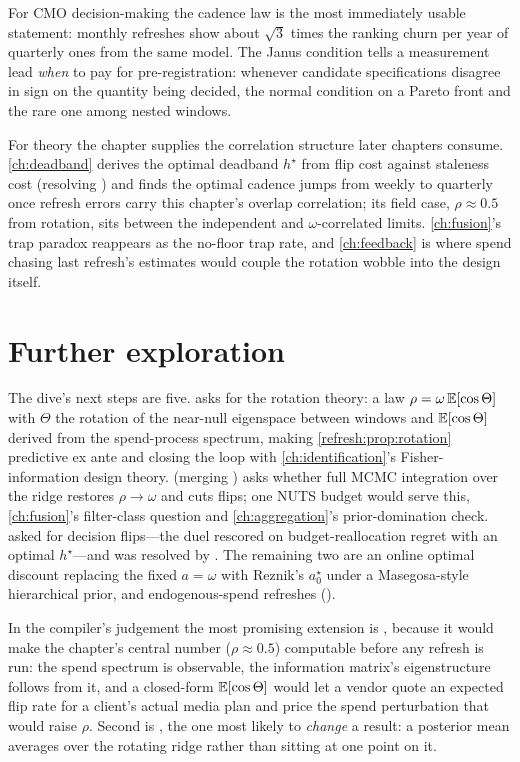 For CMO decision-making the cadence law is the most immediately usable statement: monthly refreshes show about $\sqrt{3}$ times the ranking churn per year of quarterly ones from the same model. The Janus condition tells a measurement lead \emph{when} to pay for pre-registration: whenever candidate specifications disagree in sign on the quantity being decided, the normal condition on a Pareto front and the rare one among nested windows.

For theory the chapter supplies the correlation structure later chapters consume. \cref{ch:deadband} derives the optimal deadband $h^\star$ from flip cost against staleness cost (resolving ) and finds the optimal cadence jumps from weekly to quarterly once refresh errors carry this chapter's overlap correlation; its field case, $\rho \approx 0.5$ from rotation, sits between the independent and $\omega$-correlated limits. \cref{ch:fusion}'s trap paradox reappears as the no-floor trap rate, and \cref{ch:feedback} is where spend chasing last refresh's estimates would couple the rotation wobble into the design itself.

\section{Further exploration}

The dive's next steps are five.  asks for the rotation theory: a law $\rho = \omega\,\mathbb{E}[\cos\Theta]$ with $\Theta$ the rotation of the near-null eigenspace between windows and $\mathbb{E}[\cos\Theta]$ derived from the spend-process spectrum, making \cref{refresh:prop:rotation} predictive ex ante and closing the loop with \cref{ch:identification}'s Fisher-information design theory.  (merging ) asks whether full MCMC integration over the ridge restores $\rho \to \omega$ and cuts flips; one NUTS budget would serve this, \cref{ch:fusion}'s filter-class question and \cref{ch:aggregation}'s prior-domination check.  asked for decision flips---the duel rescored on budget-reallocation regret with an optimal $h^\star$---and was resolved by . The remaining two are an online optimal discount replacing the fixed $a = \omega$ with Reznik's $a_0^\star$ under a Masegosa-style hierarchical prior, and endogenous-spend refreshes ().

In the compiler's judgement the most promising extension is , because it would make the chapter's central number ($\rho \approx 0.5$) computable before any refresh is run: the spend spectrum is observable, the information matrix's eigenstructure follows from it, and a closed-form $\mathbb{E}[\cos\Theta]$ would let a vendor quote an expected flip rate for a client's actual media plan and price the spend perturbation that would raise $\rho$. Second is , the one most likely to \emph{change} a result: a posterior mean averages over the rotating ridge rather than sitting at one point on it.

